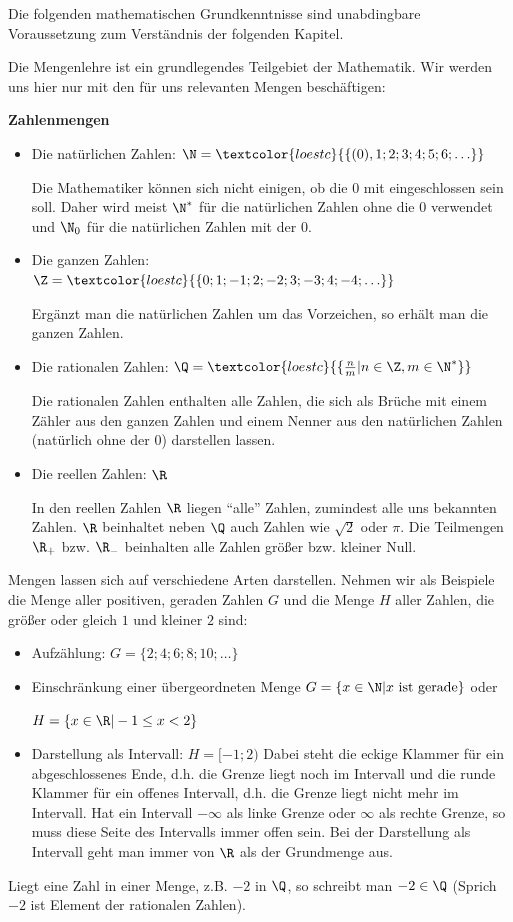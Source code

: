 Die folgenden mathematischen Grundkenntnisse sind unabdingbare Voraussetzung zum Verständnis der folgenden Kapitel.

Die Mengenlehre ist ein grundlegendes Teilgebiet der Mathematik. Wir werden uns hier nur mit den für uns relevanten Mengen beschäftigen:
\begin{tcolorbox}
	\textbf{Zahlenmengen}
	\begin{itemize}
		\item Die natürlichen Zahlen: \({\N=\textcolor{loestc}{\{(0), 1; 2; 3; 4; 5; 6; \ldots\}}}\)

        Die Mathematiker können sich nicht einigen, ob die 0 mit eingeschlossen sein soll. Daher wird meist \(\N^*\) für die natürlichen Zahlen ohne die 0 verwendet und \(\N_0\) für die natürlichen Zahlen mit der 0.
		\item Die ganzen Zahlen: \({\Z=\textcolor{loestc}{\{0; 1; -1; 2; -2; 3; -3; 4; -4;\ldots\}}}\)

        Ergänzt man die natürlichen Zahlen um das Vorzeichen, so erhält man die ganzen Zahlen.
		\item Die rationalen Zahlen: \({\Q=\textcolor{loestc}{\{\frac{n}{m}|n\in\Z, m\in\N^*\}}}\)

        Die rationalen Zahlen enthalten alle Zahlen, die sich als Brüche mit einem Zähler aus den ganzen Zahlen und einem Nenner aus den natürlichen Zahlen (natürlich ohne der 0) darstellen lassen.
		\item Die reellen Zahlen: \(\R\)

        In den reellen Zahlen \(\R\) liegen "`alle"' Zahlen, zumindest alle uns bekannten Zahlen. \(\R\) beinhaltet neben \(\Q\) auch Zahlen wie \(\sqrt{2}\) oder \(\pi\). Die Teilmengen \(\R_+\) bzw. \(\R_-\) beinhalten alle Zahlen größer bzw. kleiner Null.
	\end{itemize}
\end{tcolorbox}
Mengen lassen sich auf verschiedene Arten darstellen. Nehmen wir als Beispiele die Menge aller positiven, geraden Zahlen \(G\) und die Menge \(H\) aller Zahlen, die größer oder gleich \(1\) und kleiner \(2\) sind:
\begin{itemize}
	\item Aufzählung: \({G=\{2; 4; 6; 8; 10;\ldots \}}\)
	\item Einschränkung einer übergeordneten Menge \({G=\{x\in\N|x\text{ ist gerade}\}}\) oder

	\({H=\{x\in\R|-1\leq x<2\}}\)
	\item Darstellung als Intervall: \(H=[-1;2)\) Dabei steht die eckige Klammer für ein abgeschlossenes Ende, d.h. die Grenze liegt noch im Intervall und die runde Klammer für ein offenes Intervall, d.h. die Grenze liegt nicht mehr im Intervall. Hat ein Intervall \(-\infty\) als linke Grenze oder \(\infty\) als rechte Grenze, so muss diese Seite des Intervalls immer offen sein. Bei der Darstellung als Intervall geht man immer von \(\R\) als der Grundmenge aus.
\end{itemize}
Liegt eine Zahl in einer Menge, z.B. \(-2\) in \(\Q\), so schreibt man \({-2\in\Q}\) (Sprich \(-2\) ist Element der rationalen Zahlen).

